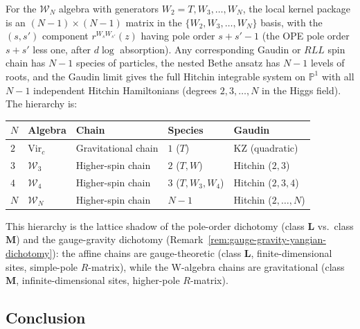 \begin{remark}%
\label{rem:general-wn-chains}%
%
For the $\mathcal{W}_N$ algebra with generators
$W_2 = T, W_3, \ldots, W_N$, the local kernel package is an
$(N-1) \times (N-1)$ matrix in the $\{W_2, W_3, \ldots, W_N\}$
basis, with the $(s, s')$ component $r^{W_s W_{s'}}(z)$ having
pole order $s + s' - 1$ (the OPE pole order $s + s'$ less one,
after $d\log$ absorption).
Any corresponding Gaudin or $RLL$ spin chain has $N - 1$ species of particles,
the nested Bethe ansatz has $N - 1$ levels of roots, and the
Gaudin limit gives the full Hitchin integrable system on
$\mathbb{P}^1$ with all $N - 1$ independent Hitchin
Hamiltonians (degrees $2, 3, \ldots, N$ in the Higgs field).
The hierarchy is:
\begin{center}
\small
\renewcommand{\arraystretch}{1.3}
\begin{tabular}{lllll}
\toprule
$N$ & Algebra & Chain & Species & Gaudin \\
\midrule
$2$ & $\mathrm{Vir}_c$ & Gravitational chain
 & $1$ ($T$) & KZ (quadratic) \\
$3$ & $\mathcal{W}_3$ & Higher-spin chain
 & $2$ ($T, W$) & Hitchin ($2, 3$) \\
$4$ & $\mathcal{W}_4$ & Higher-spin chain
 & $3$ ($T, W_3, W_4$) & Hitchin ($2, 3, 4$) \\
$N$ & $\mathcal{W}_N$ & Higher-spin chain
 & $N-1$ & Hitchin ($2, \ldots, N$) \\
\bottomrule
\end{tabular}
\end{center}
\noindent
This hierarchy is the lattice shadow of the pole-order
dichotomy (class $\mathbf{L}$ vs.\ class $\mathbf{M}$)
and the gauge-gravity dichotomy
(Remark~\ref{rem:gauge-gravity-yangian-dichotomy}):
the affine chains are gauge-theoretic (class $\mathbf{L}$,
finite-dimensional sites, simple-pole $R$-matrix), while
the W-algebra chains are gravitational
(class $\mathbf{M}$, infinite-dimensional sites,
higher-pole $R$-matrix).
\end{remark}


\subsection{Conclusion}

